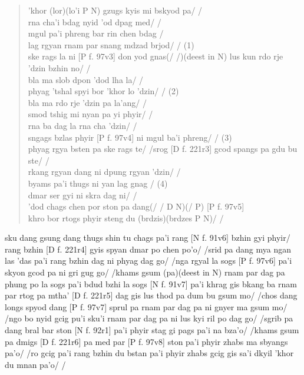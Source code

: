 \documentclass[naipra.tex]{subfiles}
\begin{document}
\begin{quote}
	'khor (lor)(lo'i P N) gzugs kyis mi bskyod pa/ /\\
	rna cha'i bdag nyid 'od dpag med/ /\\
	mgul pa'i phreng bar rin chen bdag /\\
	lag rgyan rnam par snang mdzad brjod/ / (1)\\

	ske rags la ni [P f. 97v3] don yod gnas(/ /)(deest in N) \newline 
	[D f. 221r2] [N f. 91v4] lus kun rdo rje 'dzin bzhin no/ /\\
	bla ma slob dpon 'dod lha la/ /\\
	phyag 'tshal spyi bor 'khor lo 'dzin/ / (2)\\

	bla ma rdo rje 'dzin pa la'ang/ /\\
	smod tshig mi nyan pa yi phyir/ /\\
	rna ba dag la rna cha 'dzin/ /\\
	sngags bzlas phyir [P f. 97v4] ni mgul ba'i phreng/ / (3)\\

	phyag rgya bsten pa ske rags te/ /\newline
	[N f. 91v5] srog [D f. 221r3] gcod spangs pa gdu bu ste/ /\\
	rkang rgyan dang ni dpung rgyan 'dzin/ /\\
	byams pa'i thugs ni yan lag gnag / (4)\\

	dmar ser gyi ni skra dag ni/ /\\
	'dod chags chen por ston pa dang(/ / D N)(/ P) [P f. 97v5]\\
	khro bor rtogs phyir steng du (brdzis)(brdzes P N)/ /
\end{quote}

sku dang gsung dang thugs shin tu chags pa'i rang [N f. 91v6] bzhin gyi phyir/ rang bzhin [D f. 221r4] gyis spyan dmar po chen po'o/ /srid pa dang mya ngan las 'das pa'i rang bzhin dag ni phyag dag go/ /nga rgyal la sogs [P f. 97v6] pa'i skyon gcod pa ni gri gug go/ /khams gsum (pa)(deest in N) rnam par dag pa phung po la sogs pa'i bdud bzhi la sogs [N f. 91v7] pa'i khrag gis bkang ba rnam par rtog pa mtha' [D f. 221r5] dag gis lus thod pa dum bu gsum mo/ /chos dang longs spyod dang [P f. 97v7] sprul pa rnam par dag pa ni gnyer ma gsum mo/ /ngo bo nyid gcig pu'i sku'i rnam par dag pa ni lus kyi ril po dag go/ /sgrib pa dang bral bar ston [N f. 92r1] pa'i phyir stag gi pags pa'i na bza'o/ /khams gsum pa dmigs [D f. 221r6] pa med par [P f. 97v8] ston pa'i phyir zhabs ma sbyangs pa'o/ /ro gcig pa'i rang bzhin du bstan pa'i phyir zhabs gcig gis sa'i dkyil 'khor du mnan pa'o/ /
\end{document}
